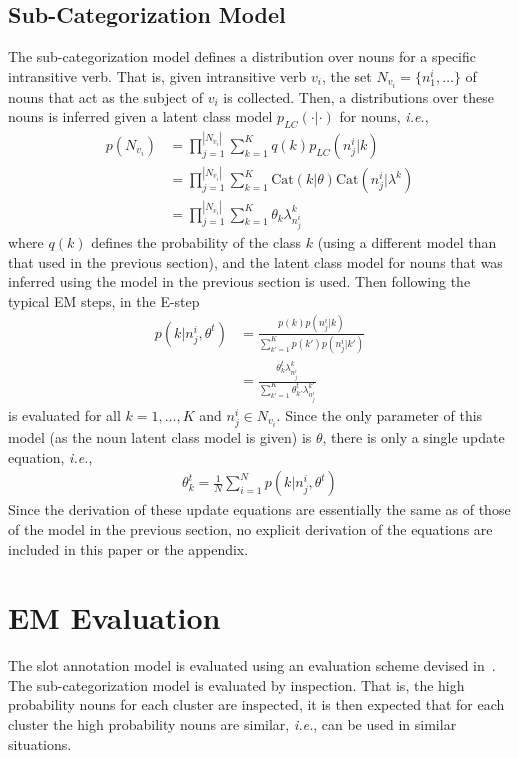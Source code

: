 \documentclass[11pt]{scrartcl}
\newcommand{\ie}{\textit{i.e.}}
\newcommand{\Cat}{\text{Cat}}
\begin{document}
\subsection{Sub-Categorization Model} %
\label{sec:nounclasses}
The sub-categorization model defines a distribution over nouns for a
specific intransitive verb. That is, given intransitive verb $v_i$,
the set $N_{v_i} = \{n^i_1, \ldots\}$ of nouns that act as the subject
of $v_i$ is collected. Then, a distributions over these nouns is
inferred given a latent class model $p_{LC}(\cdot|\cdot)$ for nouns, \ie,
\begin{align*}
  p(N_{v_i}) &= \prod_{j=1}^{|N_{v_i}|} \sum_{k=1}^K q(k)p_{LC}(n^i_j|k) \\
            &= \prod_{j=1}^{|N_{v_i}|} \sum_{k=1}^K \Cat(k|\theta)\Cat(n^i_j|\lambda^k) \\
            &= \prod_{j=1}^{|N_{v_i}|} \sum_{k=1}^K \theta_k \lambda^k_{n^i_j}
\end{align*}
where $q(k)$ defines the probability of the class $k$ (using a
different model than that used in the previous section), and the
latent class model for nouns that was inferred using the model in the
previous section is used. Then following the typical EM steps, in the E-step
\begin{align*}
    p(k|n^i_j, \theta^t) &= \frac{p(k)p(n^i_j|k)}{\sum_{k'=1}^K  p(k')p(n^i_j|k')} \\
               &= \frac{\theta^t_{k}\lambda^{k}_{n^i_j}}{\sum_{k'=1}^K  \theta^t_{k'}\lambda^{k'}_{n^i_j}}
\end{align*}
is evaluated for all $k = 1,\ldots,K$ and $n^i_j \in N_{v_i}$. Since
the only parameter of this model (as the noun latent class model is
given) is $\theta$, there is only a single update equation, \ie,
\begin{align*}
  \theta^t_k = \frac{1}{N} \sum_{i=1}^N p(k | n^i_j, \theta^t)
\end{align*}
Since the derivation of these update equations are essentially the
same as of those of the model in the previous section, no explicit
derivation of the equations are included in this paper or the
appendix.

\section{EM Evaluation} %
The slot annotation model is evaluated using an evaluation scheme
devised in~\cite{rooth1999inducing}. The sub-categorization model is
evaluated by inspection. That is, the high probability nouns for each
cluster are inspected, it is then expected that for each cluster the
high probability nouns are similar, \ie, can be used in similar
situations.
\end{document}
